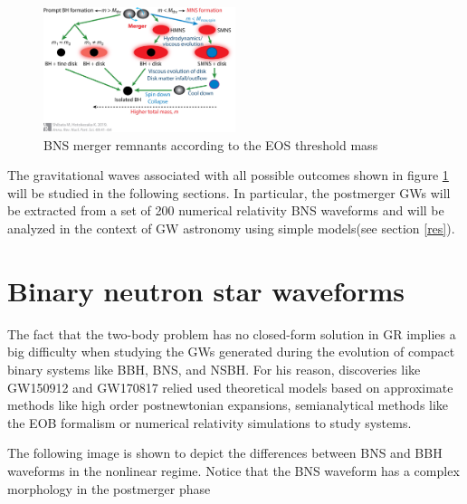 \begin{figure}[hbt!]
\begin{center}
\includegraphics[width=0.5\textwidth, angle=0]{images/shi.jpeg}
\captionsetup{width=0.8\textwidth}
\caption{BNS merger remnants according to the EOS threshold mass}
\label{BNS-out}
\end{center}
\end{figure}
\FloatBarrier


The gravitational waves associated with all possible outcomes shown in figure \ref{BNS-out} will be studied in the following sections. In particular, the postmerger GWs will be extracted from a set of 200 numerical relativity BNS waveforms and will be analyzed in the context of GW astronomy using simple models(see section \ref{res}).

\section{Binary neutron star waveforms}

The fact that the two-body problem has no closed-form solution in GR implies a big difficulty when studying the GWs generated during the evolution of compact binary systems like BBH, BNS, and NSBH. For his reason, discoveries like GW150912 and GW170817 relied used theoretical models based on approximate methods like high order postnewtonian expansions, semianalytical methods like the  EOB formalism \cite{PhysRevD.96.121501,Dietrich:2018uni}  or numerical relativity simulations to study systems.


The following image is shown to depict the differences between BNS and BBH waveforms in the nonlinear regime. Notice that the BNS waveform has a complex morphology in the postmerger phase

